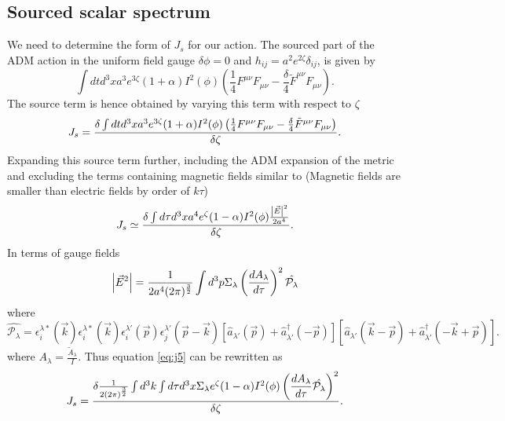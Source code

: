 \documentclass[12pt,a4paper]{article}
\numberwithin{equation}{section}
\numberwithin{equation}{section}
\begin{document}
\subsection{Sourced scalar spectrum}
We need to determine the form of $J_s$ for our action. 
The sourced part of the ADM action in the uniform field gauge $\delta \phi=0$ and $h_{ij}=a^2 e^{2\zeta} \delta_{ij} $, is given by
\begin{equation}
    \int dt d^3x a^3 e^{3\zeta} (1+\alpha) I^2(\phi) \left( \frac{1}{4}F^{\mu\nu}F_{\mu \nu} -\frac{\delta}{4}\tilde{F}^{\mu \nu}F_{\mu\nu}\right).
\end{equation}
The source term is hence obtained by varying this term with respect to $\zeta$ 
\begin{equation}
    J_s = \fdv{ \int dt d^3x a^3 e^{3\zeta} (1+\alpha) I^2(\phi) \left( \frac{1}{4}F^{\mu\nu}F_{\mu \nu} -\frac{\delta}{4}\tilde{F}^{\mu \nu}F_{\mu\nu}\right) }{\zeta}.
\end{equation}
Expanding this source term further, including the ADM expansion of the metric and excluding the terms containing magnetic fields similar to \cite{Artymowski:2020pci} (Magnetic fields are smaller than electric fields by order of $k\tau$)
\begin{equation}
    \begin{split}
       J_s \simeq \fdv{ \int d\tau d^3x a^4 e^{\zeta} (1-\alpha) I^2(\phi) \frac{\abs{\vec{E}}^2}{2 a^4}}{\zeta}. 
       \label{eq:j5}\\
    \end{split}
\end{equation}
In terms of gauge fields
\begin{equation}
    \abs{\vec{E}^2} = \frac{1}{2 a^4 (2\pi)^\frac{3}{2}}\int d^3p \Sigma_{\lambda} \left( \dfrac{d A_{\lambda}}{d\tau} \right)^2 \hat{\mathcal{P_{\lambda}}}
\end{equation}
where 
\begin{equation}
    \hat{\mathcal{P_{\lambda}}} =  \epsilon_i^{\lambda*}(\vec{k}) \epsilon_i^{\lambda*}(\vec{k})
\epsilon_i^{\lambda'}(\vec{p})\epsilon_j^{\lambda'}(\vec{p}-\vec{k}) \left[ \hat{a}_{\lambda'}(\vec{p})+\hat{a}^{\dagger}_{\lambda'}(-\vec{p})\right]\left[ \hat{a}_{\lambda'}(\vec{k}-\vec{p})+\hat{a}^{\dagger}_{\lambda'}(-\vec{k}+\vec{p})\right].
\end{equation}
where $A_{\lambda}=\frac{\tilde{A}_{\lambda}}{I}$.
Thus equation \eqref{eq:j5} can be rewritten as 
\begin{equation}
    \begin{split}
       J_s = \fdv{\frac{1}{2 (2\pi)^\frac{3}{2}}\int d^3k \int d\tau d^3x  \Sigma_{\lambda}e^{\zeta} (1-\alpha) I^2(\phi) \left( \dfrac{d A_{\lambda}}{d\tau}\hat{\mathcal{P_{\lambda}}} \right)^2}{\zeta}.  \\
    \end{split}
\end{equation}
\end{document}
